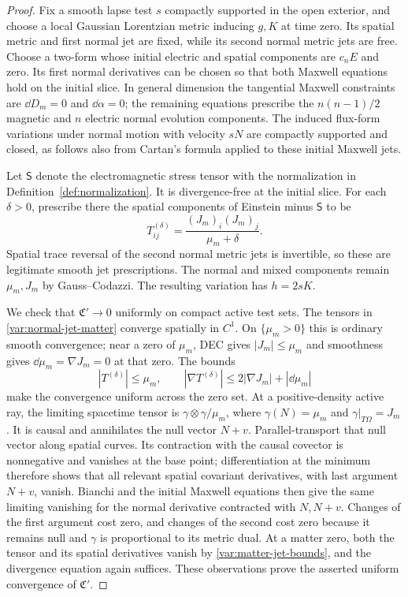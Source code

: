 \begin{proof}
Fix a smooth lapse test $s$ compactly supported in the open
exterior, and choose a local Gaussian Lorentzian metric inducing
$g,K$ at time zero.  Its spatial metric and first normal jet are
fixed, while its second normal metric jets are free.  Choose a
two-form whose initial electric and spatial components are
$c_n E$ and zero.  Its first normal derivatives can be chosen so
that both Maxwell equations hold on the initial slice.  In
general dimension the tangential Maxwell constraints are
$\dd D_m=0$ and $\dd\alpha=0$; the remaining equations prescribe
the $n(n-1)/2$ magnetic and $n$ electric normal evolution
components.  The induced flux-form variations under normal
motion with velocity $sN$ are compactly supported and closed,
as follows also from Cartan's formula applied to these initial
Maxwell jets.

Let $\mathsf S$ denote the electromagnetic stress tensor with
the normalization in Definition~\ref{def:normalization}.
It is divergence-free at the initial slice.  For each
$\delta>0$, prescribe there the spatial components of
Einstein minus $\mathsf S$ to be
\begin{equation}
 T^{(\delta)}_{ij}
       =\frac{(J_m)_i(J_m)_j}{\mu_m+\delta}.
 \label{var:normal-jet-matter}
\end{equation}
Spatial trace reversal of the second normal metric jets is
invertible, so these are legitimate smooth jet prescriptions.
The normal and mixed components remain $\mu_m,J_m$ by
Gauss--Codazzi.  The resulting variation has $h=2sK$.

We check that $\mathfrak C'\to0$ uniformly on compact active
test sets.  The tensors in \eqref{var:normal-jet-matter}
converge spatially in $C^1$.  On $\{\mu_m>0\}$ this is
ordinary smooth convergence; near a zero of $\mu_m$, DEC gives
$|J_m|\le\mu_m$ and smoothness gives
$\dd\mu_m=\nabla J_m=0$ at that zero.  The bounds
\begin{equation}
 |T^{(\delta)}|\le\mu_m,
 \qquad
 |\nabla T^{(\delta)}|
       \le 2|\nabla J_m|+|\dd\mu_m|
 \label{var:matter-jet-bounds}
\end{equation}
make the convergence uniform across the zero set.
At a positive-density active ray, the limiting spacetime tensor
is $\gamma\otimes\gamma/\mu_m$, where
$\gamma(N)=\mu_m$ and $\gamma|_{T\Omega}=J_m$.
It is causal and annihilates the null vector $N+v$.
Parallel-transport that null vector along spatial curves.
Its contraction with the causal covector is nonnegative and
vanishes at the base point; differentiation at the minimum
therefore shows that all relevant spatial covariant
derivatives, with last argument $N+v$, vanish.  Bianchi and the
initial Maxwell equations then give the same limiting
vanishing for the normal derivative contracted with
$N,N+v$.  Changes of the first argument cost zero, and changes
of the second cost zero because it remains null and
$\gamma$ is proportional to its metric dual.  At a matter
zero, both the tensor and its spatial derivatives vanish by
\eqref{var:matter-jet-bounds}, and the divergence equation
again suffices.  These observations prove the asserted uniform
convergence of $\mathfrak C'$.


\end{proof}
